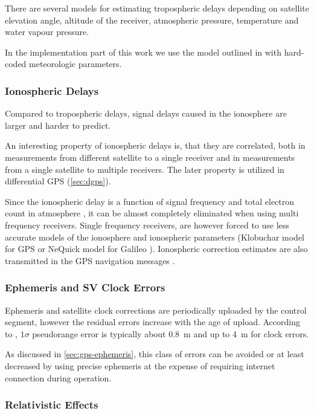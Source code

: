 There are several models for estimating tropospheric delays depending on satellite
elevation angle, altitude of the receiver, atmospheric pressure, temperature and
water vapour pressure.

In the implementation part of this work we use the model outlined in \cite{navipedia-tropospheric}
with hard-coded meteorologic parameters.

\subsubsection{Ionospheric Delays}

Compared to tropospheric delays, signal delays caused in the ionosphere are larger and
harder to predict.

An interesting property of ionospheric delays is, that they are correlated,
both in measurements from different satellite to a single receiver and in measurements
from a single satellite to multiple receivers.
The later property is utilized in differential GPS (\cref{sec:dgps}).

Since the ionospheric delay is a function of signal frequency and total electron
count in atmosphere \cite{kaplan06}, it can be almost completely
eliminated when using multi frequency receivers.
Single frequency receivers, are however forced to use less accurate
models of the ionosphere and ionospheric parameters (Klobuchar model for GPS
\cite{navipedia-klobuchar} or NeQuick model for Galileo \cite{navipedia-nequick}).
Ionospheric correction estimates are also transmitted in the GPS navigation
messages \cite{fyfe92}.

\subsubsection{Ephemeris and SV Clock Errors}

Ephemeris and satellite clock corrections are periodically uploaded by the control
segment, however the residual errors increase with the age of upload.
According to \cite{kaplan06}, \(1 \sigma\) pseudorange error is typically about \SI{0.8}{\meter}
and up to \SI{4}{\meter} for clock errors.

As discussed in \cref{sec:gps-ephemeris}, this class of errors can be avoided or at least decreased by using precise ephemeris
at the expense of requiring internet connection during operation.

\subsubsection{Relativistic Effects}

